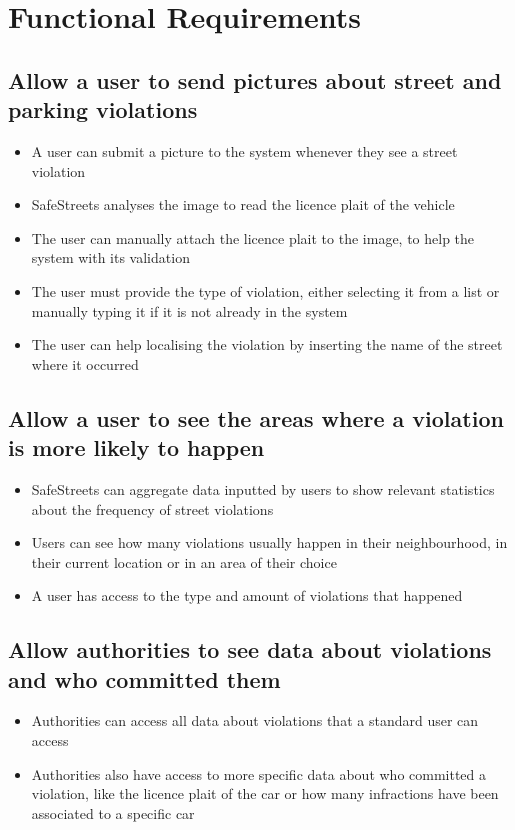 \section{Functional Requirements}

\subsection{Allow a user to send pictures about street and parking violations}
\begin{itemize}
    \item A user can submit a picture to the system whenever they see a street violation
    \item SafeStreets analyses the image to read the licence plait of the vehicle
    \item The user can manually attach the licence plait to the image, to help the system with its validation
    \item The user must provide the type of violation, either selecting it from a list or manually typing it if it is not already in the system
    \item The user can help localising the violation by inserting the name of the street where it occurred
\end{itemize}

\subsection{Allow a user to see the areas where a violation is more likely to happen}
\begin{itemize}
    \item SafeStreets can aggregate data inputted by users to show relevant statistics about the frequency of street violations
    \item Users can see how many violations usually happen in their neighbourhood, in their current location or in an area of their choice
    \item A user has access to the type and amount of violations that happened
\end{itemize}

\subsection{Allow authorities to see data about violations and who committed them}
\begin{itemize}
    \item Authorities can access all data about violations that a standard user can access
    \item Authorities also have access to more specific data about who committed a violation, like the licence plait of the car or how many infractions have been associated to a specific car
\end{itemize}

